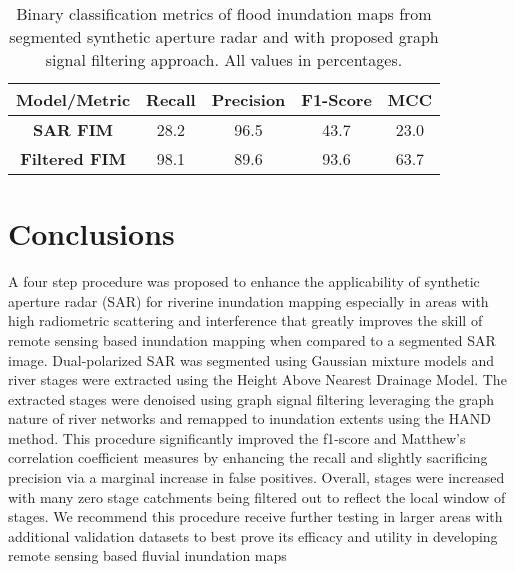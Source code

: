 \documentclass{article}
\begin{document}
%
\begin{table}[htb]
    \caption{Binary classification metrics of flood inundation maps from segmented synthetic aperture radar and with proposed graph signal filtering approach. All values in percentages.}
    \label{tbl:metric_results}
    \begin{center}
    \begin{tabular}{ |c|c|c|c|c| }
        \hline
             \textbf{Model/Metric} & \textbf{Recall} & \textbf{Precision} & \textbf{F1-Score} &\textbf{MCC} \\
            \hline
            \textbf{SAR FIM} & 28.2 & 96.5 & 43.7 & 23.0  \\
            \hline
            \textbf{Filtered FIM} & 98.1 & 89.6  & 93.6 & 63.7\\

         \hline
    \end{tabular}
    \end{center}
\end{table}
%
\section{Conclusions}
\label{sec:conclusions}
%
A four step procedure was proposed to enhance the applicability of synthetic aperture radar (SAR) for riverine inundation mapping especially in areas with high radiometric scattering and interference that greatly improves the skill of remote sensing based inundation mapping when compared to a segmented SAR image.
Dual-polarized SAR was segmented using Gaussian mixture models and river stages were extracted using the Height Above Nearest Drainage Model. 
The extracted stages were denoised using graph signal filtering leveraging the graph nature of river networks and remapped to inundation extents using the HAND method.
This procedure significantly improved the f1-score and Matthew's correlation coefficient measures by enhancing the recall and slightly sacrificing precision via a marginal increase in false positives.
Overall, stages were increased with many zero stage catchments being filtered out to reflect the local window of stages. 
We recommend this procedure receive further testing in larger areas with additional validation datasets to best prove its efficacy and utility in developing remote sensing based fluvial inundation maps
%



%
\end{document}
